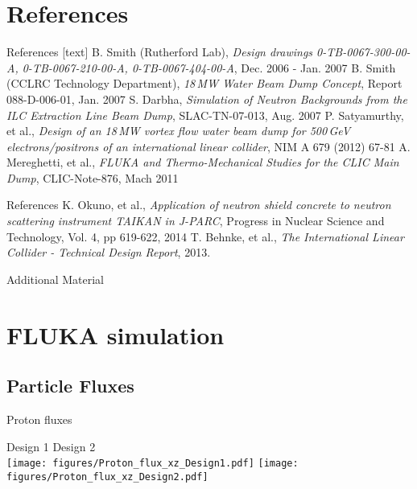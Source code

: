 \documentclass[xcolor={dvipsnames}]{beamer}
\begin{document}
\section*{References}
\begin{thebibliography}{9}
\begin{frame}{References}
[text]
 B. Smith (Rutherford Lab), \emph{Design drawings 0-TB-0067-300-00-A, 0-TB-0067-210-00-A, 0-TB-0067-404-00-A}, Dec. 2006 - Jan. 2007
 B. Smith (CCLRC Technology Department), \emph{18\,MW Water Beam Dump Concept}, Report 088-D-006-01, Jan. 2007
 S. Darbha, \emph{Simulation of Neutron Backgrounds from the ILC Extraction Line Beam Dump}, SLAC-TN-07-013, Aug. 2007
 P. Satyamurthy, et al., \emph{Design of an 18\,MW vortex flow water beam dump for 500\,GeV electrons/positrons of an international linear collider}, NIM A 679 (2012) 67-81
 A. Mereghetti, et al., \emph{FLUKA and Thermo-Mechanical Studies for the CLIC Main Dump}, CLIC-Note-876, Mach 2011
\end{frame}
\begin{frame}{References}
 K. Okuno, et al., \emph{Application of neutron shield concrete to neutron scattering instrument TAIKAN in J-PARC}, Progress in Nuclear Science and Technology, Vol. 4, pp 619-622, 2014
 T. Behnke, et al., \emph{The International Linear Collider - Technical Design Report}, 2013.
\end{frame}
\end{thebibliography}

\appendix

\begin{frame}
\begin{center}
\LARGE Additional Material
\end{center}
  \tableofcontents
\end{frame}

\section{FLUKA simulation}
\subsection{Particle Fluxes}
\begin{frame}{Proton fluxes}
\begin{center}
\hspace*{2cm} Design 1 \hfill Design 2 \hspace*{2cm} \\
  \texttt{[image: figures/Proton\_flux\_xz\_Design1.pdf]}
    \texttt{[image: figures/Proton\_flux\_xz\_Design2.pdf]}
\end{center}
\end{frame}
\end{document}
